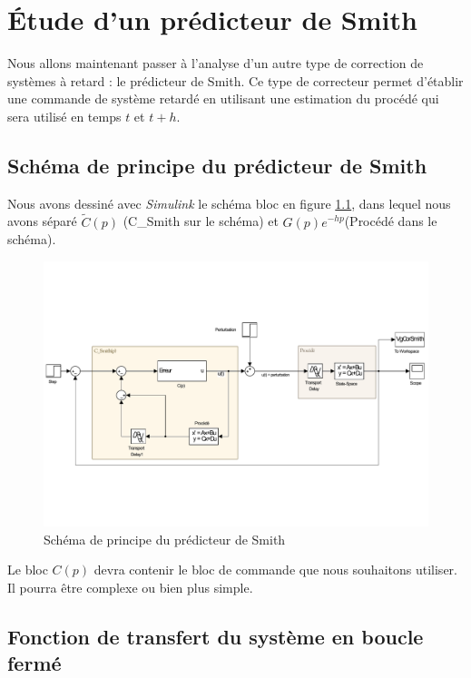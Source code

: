 \chapter{Étude d'un prédicteur de Smith}
Nous allons maintenant passer à l'analyse d'un autre type de correction de systèmes à retard : le prédicteur de Smith. Ce type de correcteur permet d'établir une commande de système retardé en utilisant une estimation du procédé qui sera utilisé en temps $t$ et $t+h$.

\section{Schéma de principe du prédicteur de Smith}
Nous avons dessiné avec \emph{Simulink} le schéma bloc en figure \ref{fig:sch_predicteurSmith}, dans lequel nous avons séparé $\tilde{C}(p)$ (C\_Smith sur le schéma) et  $ G(p) e ^{-hp}$(Procédé dans le schéma).
\begin{figure}[!ht]
\centering
\includegraphics[width=\textwidth]{./IV/images/schema_Predicteur.pdf}
\caption{Schéma de principe du prédicteur de Smith}\label{fig:sch_predicteurSmith}
\end{figure}
Le bloc $C(p)$ devra contenir le bloc de commande que nous souhaitons utiliser. Il pourra être complexe ou bien plus simple.

\section{Fonction de transfert du système en boucle fermé}